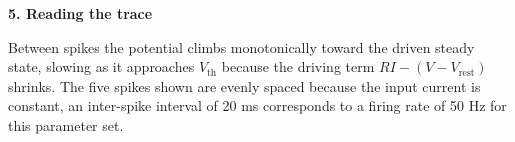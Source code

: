 \documentclass[10pt]{article}
\newcommand{\heading}[1]{{\bfseries\color{accent} #1}}
\begin{document}
\heading{5. Reading the trace}

Between spikes the potential climbs monotonically toward the driven steady
state, slowing as it approaches $V_{\text{th}}$ because the driving term
$R I - (V - V_{\text{rest}})$ shrinks. The five spikes shown are evenly
spaced because the input current is constant, an inter-spike interval of
20 ms corresponds to a firing rate of 50 Hz for this parameter set.
\end{document}
